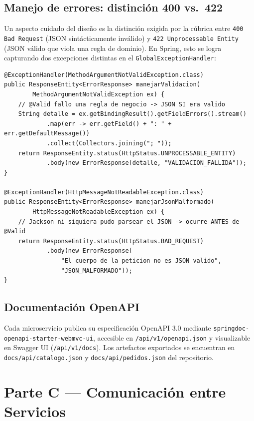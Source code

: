 \documentclass[11pt,a4paper]{article}
\begin{document}
\subsection{Manejo de errores: distinción 400 vs.\ 422}

Un aspecto cuidado del diseño es la distinción exigida por la rúbrica entre
\texttt{400 Bad Request} (JSON sintácticamente inválido) y
\texttt{422 Unprocessable Entity} (JSON válido que viola una regla de
dominio). En Spring, esto se logra capturando dos excepciones distintas en el
\texttt{GlobalExceptionHandler}:

\begin{lstlisting}[caption={Distinción entre JSON malformado (400) y validación de dominio (422)}, label={lst:exceptionhandler}]
@ExceptionHandler(MethodArgumentNotValidException.class)
public ResponseEntity<ErrorResponse> manejarValidacion(
        MethodArgumentNotValidException ex) {
    // @Valid fallo una regla de negocio -> JSON SI era valido
    String detalle = ex.getBindingResult().getFieldErrors().stream()
            .map(err -> err.getField() + ": " + err.getDefaultMessage())
            .collect(Collectors.joining("; "));
    return ResponseEntity.status(HttpStatus.UNPROCESSABLE_ENTITY)
            .body(new ErrorResponse(detalle, "VALIDACION_FALLIDA"));
}

@ExceptionHandler(HttpMessageNotReadableException.class)
public ResponseEntity<ErrorResponse> manejarJsonMalformado(
        HttpMessageNotReadableException ex) {
    // Jackson ni siquiera pudo parsear el JSON -> ocurre ANTES de @Valid
    return ResponseEntity.status(HttpStatus.BAD_REQUEST)
            .body(new ErrorResponse(
                "El cuerpo de la peticion no es JSON valido",
                "JSON_MALFORMADO"));
}
\end{lstlisting}

\subsection{Documentación OpenAPI}

Cada microservicio publica su especificación OpenAPI 3.0 mediante
\texttt{springdoc-openapi-starter-webmvc-ui}, accesible en
\texttt{/api/v1/openapi.json} y visualizable en Swagger UI
(\texttt{/api/v1/docs}). Los artefactos exportados se encuentran en
\texttt{docs/api/catalogo.json} y \texttt{docs/api/pedidos.json} del
repositorio.

\section{Parte C — Comunicación entre Servicios}
\end{document}
